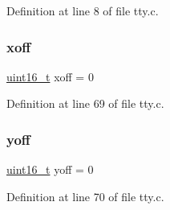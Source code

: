 Definition at line 8 of file tty.\+c.

\mbox{\label{a00140_abaa0d20f0e52ce0d3a7d706f6ac16266_abaa0d20f0e52ce0d3a7d706f6ac16266}} 
\subsubsection{\texorpdfstring{xoff}{xoff}}
{\footnotesize\ttfamily \hyperlink{a00116_a273cf69d639a59973b6019625df33e30_a273cf69d639a59973b6019625df33e30}{uint16\+\_\+t} xoff = 0}



Definition at line 69 of file tty.\+c.

\mbox{\label{a00140_a1a7539764d0ae8cd06ce45c62cf92bca_a1a7539764d0ae8cd06ce45c62cf92bca}} 
\subsubsection{\texorpdfstring{yoff}{yoff}}
{\footnotesize\ttfamily \hyperlink{a00116_a273cf69d639a59973b6019625df33e30_a273cf69d639a59973b6019625df33e30}{uint16\+\_\+t} yoff = 0}



Definition at line 70 of file tty.\+c.

